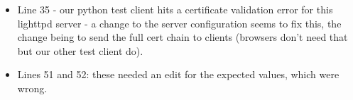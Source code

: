 \begin{itemize}
    \item Line 35 - our python test client hits a certificate validation error
        for this lighttpd server - a change to the server configuration seems
        to fix this, the change being to send the full cert chain to clients
        (browsers don't need that but our other test client do).

    \item Lines 51 and 52: these needed an edit for the expected values, which were
        wrong.

\end{itemize}

